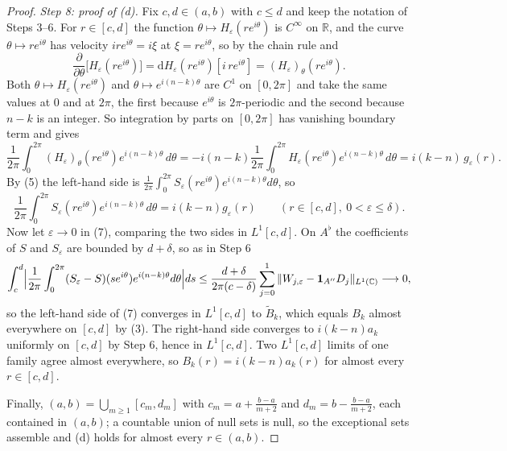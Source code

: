 \begin{proof}
\emph{Step 8: proof of (d).}  Fix $c,d\in(a,b)$ with $c\le d$ and keep the
notation of Steps 3--6.  For $r\in[c,d]$ the function
$\theta\mapsto H_\varepsilon(re^{i\theta})$ is $C^\infty$ on $\mathbb{R}$, and
the curve $\theta\mapsto re^{i\theta}$ has velocity $ire^{i\theta}=i\xi$ at
$\xi=re^{i\theta}$, so by the chain rule and 
\[
  \frac{\partial}{\partial\theta}\bigl[H_\varepsilon(re^{i\theta})\bigr]
  =\mathrm{d}H_\varepsilon(re^{i\theta})[i\,re^{i\theta}]
  =(H_\varepsilon)_\theta(re^{i\theta}).
\]
Both $\theta\mapsto H_\varepsilon(re^{i\theta})$ and
$\theta\mapsto e^{i(n-k)\theta}$ are $C^1$ on $[0,2\pi]$ and take the same
values at $0$ and at $2\pi$, the first because $e^{i\theta}$ is $2\pi$-periodic
and the second because $n-k$ is an integer.  So integration by parts on
$[0,2\pi]$ has vanishing boundary term and gives
\[
  \frac1{2\pi}\int_0^{2\pi}(H_\varepsilon)_\theta(re^{i\theta})
    e^{i(n-k)\theta}\,d\theta
  =-i(n-k)\frac1{2\pi}\int_0^{2\pi}H_\varepsilon(re^{i\theta})
    e^{i(n-k)\theta}\,d\theta
  =i(k-n)\,g_\varepsilon(r).
\]
By (5) the left-hand side is
$\frac1{2\pi}\int_0^{2\pi}S_\varepsilon(re^{i\theta})e^{i(n-k)\theta}d\theta$,
so
\begin{equation}\tag{7}
  \frac1{2\pi}\int_0^{2\pi}S_\varepsilon(re^{i\theta})
    e^{i(n-k)\theta}\,d\theta=i(k-n)g_\varepsilon(r)
  \qquad(r\in[c,d],\ 0<\varepsilon\le\delta).
\end{equation}
Now let $\varepsilon\to0$ in (7), comparing the two sides in $L^{1}[c,d]$.  On
$A^\flat$ the coefficients of $S$ and $S_\varepsilon$ are bounded by
$d+\delta$, so as in Step 6
\[
  \int_c^d\Bigl|\frac1{2\pi}\int_0^{2\pi}(S_\varepsilon-S)(se^{i\theta})
    e^{i(n-k)\theta}d\theta\Bigr|ds
  \le\frac{d+\delta}{2\pi(c-\delta)}
    \sum_{j=0}^1\|W_{j,\varepsilon}-\mathbf1_{A''}D_j\|_{L^{1}(\mathbb{C})}
  \longrightarrow0,
\]
so the left-hand side of (7) converges in $L^{1}[c,d]$ to $\widetilde B_k$,
which equals $B_k$ almost everywhere on $[c,d]$ by (3).  The right-hand side
converges to $i(k-n)a_k$ uniformly on $[c,d]$ by Step 6, hence in
$L^{1}[c,d]$.  Two $L^{1}[c,d]$ limits of one family agree almost everywhere,
so $B_k(r)=i(k-n)a_k(r)$ for almost every $r\in[c,d]$.

Finally, $(a,b)=\bigcup_{m\ge1}[c_m,d_m]$ with
$c_m=a+\tfrac{b-a}{m+2}$ and $d_m=b-\tfrac{b-a}{m+2}$, each contained in
$(a,b)$; a countable union of null sets is null, so the exceptional sets
assemble and (d) holds for almost every $r\in(a,b)$.


\end{proof}
